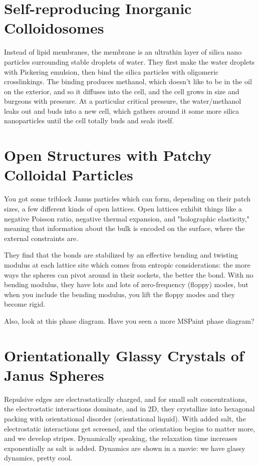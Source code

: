 \documentclass[11pt]{amsart}
\begin{document}
\section{Self-reproducing Inorganic Colloidosomes}
Instead of lipid membranes, the membrane is an ultrathin layer of silica nano particles surrounding stable droplets of water. They first make the water droplets with Pickering emulsion, then bind the silica particles with oligomeric crosslinkings. The binding produces methanol, which doesn't like to be in the oil on the exterior, and so it diffuses into the cell, and the cell grows in size and burgeons with pressure. At a particular critical pressure, the water/methanol leaks out and buds into a new cell, which gathers around it some more silica nanoparticles until the cell totally buds and seals itself.

\section{Open Structures with Patchy Colloidal Particles}
You got some triblock Janus particles which can form, depending on their patch sizes, a few different kinds of open lattices. Open lattices exhibit things like a negative Poisson ratio, negative thermal expansion, and "holographic elasticity," meaning that information about the bulk is encoded on the surface, where the external constraints are.

They find that the bonds are stabilized by an effective bending and twisting modulus at each lattice site which comes from entropic considerations: the more ways the spheres can pivot around in their sockets, the better the bond. With no bending modulus, they have lots and lots of zero-frequency (floppy) modes, but when you include the bending modulus, you lift the floppy modes and they become rigid.

Also, look at this phase diagram. Have you seen a more MSPaint phase diagram?

\section{Orientationally Glassy Crystals of Janus Spheres}
Repulsive edges are electrostatically charged, and for small salt concentrations, the electrostatic interactions dominate, and in 2D, they crystallize into hexagonal packing with orientational disorder (orientational liquid). With added salt, the electrostatic interactions get screened, and the orientation begins to matter more, and we develop stripes. Dynamically speaking, the relaxation time increases exponentially as salt is added. Dynamics are shown in a movie: we have glassy dynamics, pretty cool.
\end{document}
